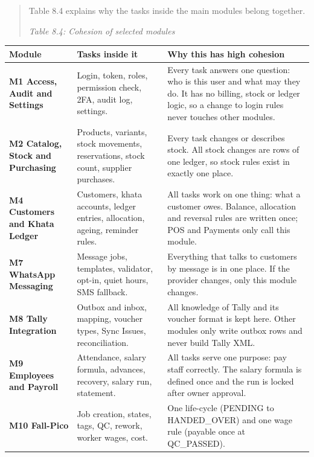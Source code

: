 \documentclass[12pt,a4paper]{article}
\providecommand{\real}[1]{#1}
\begin{document}
\begin{quote}
Table 8.4 explains why the tasks inside the main modules belong
together.

\emph{Table 8.4: Cohesion of selected modules}
\end{quote}

\begin{longtable}[]{@{}
  >{\raggedright\arraybackslash}p{(\columnwidth - 4\tabcolsep) * \real{0.2099}}
  >{\raggedright\arraybackslash}p{(\columnwidth - 4\tabcolsep) * \real{0.3204}}
  >{\raggedright\arraybackslash}p{(\columnwidth - 4\tabcolsep) * \real{0.4696}}@{}}
\toprule\noalign{}
\textbf{Module} & \textbf{Tasks inside it} & \textbf{Why this has high cohesion} \\
\midrule\noalign{}
\endhead
\bottomrule\noalign{}
\endlastfoot
\textbf{M1 Access, Audit and Settings} & Login, token, roles, permission
check, 2FA, audit log, settings. & Every task answers one question: who
is this user and what may they do. It has no billing, stock or ledger
logic, so a change to login rules never touches other modules. \\
\textbf{M2 Catalog, Stock and Purchasing} & Products, variants, stock
movements, reservations, stock count, supplier purchases. & Every task
changes or describes stock. All stock changes are rows of one ledger, so
stock rules exist in exactly one place. \\
\textbf{M4 Customers and Khata Ledger} & Customers, khata accounts,
ledger entries, allocation, ageing, reminder rules. & All tasks work on
one thing: what a customer owes. Balance, allocation and reversal rules
are written once; POS and Payments only call this module. \\
\textbf{M7 WhatsApp Messaging} & Message jobs, templates, validator,
opt-in, quiet hours, SMS fallback. & Everything that talks to customers
by message is in one place. If the provider changes, only this module
changes. \\
\textbf{M8 Tally Integration} & Outbox and inbox, mapping, voucher
types, Sync Issues, reconciliation. & All knowledge of Tally and its
voucher format is kept here. Other modules only write outbox rows and
never build Tally XML. \\
\textbf{M9 Employees and Payroll} & Attendance, salary formula,
advances, recovery, salary run, statement. & All tasks serve one
purpose: pay staff correctly. The salary formula is defined once and the
run is locked after owner approval. \\
\textbf{M10 Fall-Pico} & Job creation, states, tags, QC, rework, worker
wages, cost. & One life-cycle (PENDING to HANDED\_OVER) and one wage
rule (payable once at QC\_PASSED). \\
\end{longtable}
\end{document}
